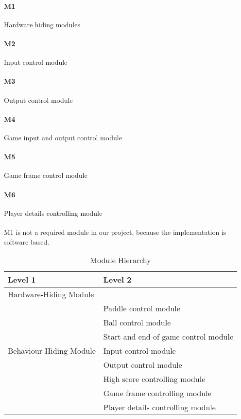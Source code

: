 \documentclass[12pt,letterpaper]{article}
\begin{document}
	\paragraph{M1} Hardware hiding modules
	\paragraph{M2} Input control module
	\paragraph{M3} Output control module
	\paragraph{M4} Game input and output control module
	\paragraph{M5} Game frame control module
	\paragraph{M6} Player details controlling module
	\paragraph{} M1 is not a required module in our project, because the implementation is software based.

\begin{table}[h!]
\centering
\begin{tabular}{p{} p{}}
\toprule
\textbf{Level 1} & \textbf{Level 2}\\
\midrule
{Hardware-Hiding Module} & ~ \\
\midrule
\multirow{7}{0.3\textwidth}{Behaviour-Hiding Module} & Paddle control module\\
& Ball control module\\
& Start and end of game control module\\
& Input control module\\
& Output control module\\
& High score controlling module\\
\midrule
\multirow{3}{0.3\textwidth}{Software Decision Module} & Game frame controlling module\\
& Player details controlling module\\
\bottomrule
\end{tabular}
\caption{Module Hierarchy}
\label{TblMH}
\end{table}
\end{document}
